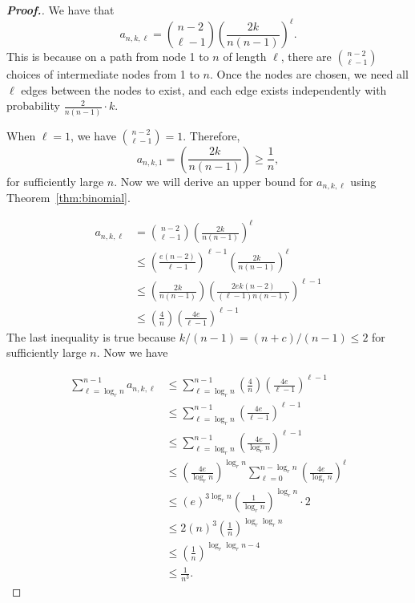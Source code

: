 \documentclass[11pt]{article}
\numberwithin{equation}{section}
\numberwithin{figure}{section}
\theoremstyle{plain}
\theoremstyle{definition}
\begin{document}
\begin{proof}[\textbf{Proof.}]
We have that 
\begin{equation*}
a_{n,k,\ell}=\binom{n-2}{\ell-1}\left(\frac{2k}{n(n-1)}\right)^\ell.
\end{equation*}
This is because on a path from node 1 to $n$ of length $\ell$,
there are $\binom{n-2}{\ell-1}$ choices of intermediate
nodes from 1 to $n$. Once the nodes are chosen, we need all $\ell$
edges between the nodes to exist, and each edge exists independently 
with probability $\frac{2}{n(n-1)}\cdot k.$

When $\ell=1$, we have $\binom{n-2}{\ell-1}=1$.
Therefore,
\begin{equation*}
a_{n,k,1}=\left(\frac{2k}{n(n-1)}\right)\geq \frac{1}{n},
\end{equation*}
for sufficiently large $n$.
Now we will derive an upper bound for $a_{n,k,\ell}$ using
Theorem~\ref{thm:binomial}.


\begin{align*}
a_{n,k,\ell} &= \binom{n-2}{\ell-1}\left(\frac{2k}{n(n-1)}\right)^\ell \\
&\leq \left(\frac{e(n-2)}{\ell-1}\right)^{\ell-1} \left(\frac{2k}{n(n-1)}\right)^\ell \\
&\leq \left(\frac{2k}{n(n-1)}\right) \left(\frac{2ek(n-2)}{(\ell-1)n(n-1)}\right)^{\ell-1} \\
&\leq \left(\frac{4}{n}\right)\left(\frac{4e}{\ell-1}\right)^{\ell-1}
\end{align*}
The last inequality is true because
$k/(n-1)=(n+c)/(n-1)\leq 2$ for sufficiently large $n$.
Now we have


\begin{align}
\sum_{\ell=\log_r n}^{n-1} a_{n,k,\ell}
&\leq \sum_{\ell=\log_r n}^{n-1} \left(\frac{4}{n}\right)\left(\frac{4e}{\ell-1}\right)^{\ell-1}\nonumber \\
&\leq \sum_{\ell=\log_r n}^{n-1}
\left(\frac{4e}{\ell-1}\right)^{\ell-1} \nonumber\\
&\leq \sum_{\ell=\log_r n}^{n-1}
\left(\frac{4e}{\log_r n}\right)^{\ell-1} \nonumber\\
&\leq \left(\frac{4e}{\log_r n}\right)^{\log_r n}
\sum_{\ell=0}^{n-\log_r n}
\left(\frac{4e}{\log_r n}\right)^\ell \nonumber\\
&\leq \left(e\right)^{3\log_r n}\left(\frac{1}{\log_r n}\right)^{\log_r n}\cdot 2\label{eq:sum}\\
&\leq 2\left(n\right)^3\left(\frac{1}{n}\right)^{\log_r\log_r n}\label{eq:loglog}\\
&\leq \left(\frac{1}{n}\right)^{\log_r\log_r n-4}\nonumber\\
&\leq \frac{1}{n^{3}}.\nonumber
\end{align}


\end{proof}
\end{document}
